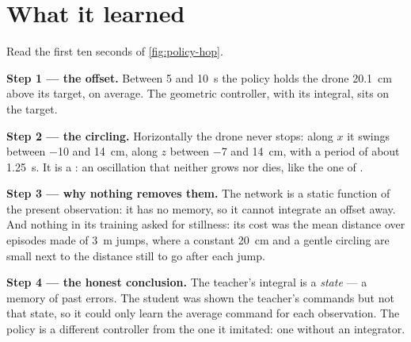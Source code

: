 \section{What it learned}


\begin{example}[Hover]
\label{ex:policy-hover}
Read the first ten seconds of \cref{fig:policy-hop}.

\textbf{Step 1 — the offset.} Between 5 and \SI{10}{s} the policy holds the drone \SI{20.1}{cm} above its target, on average. The geometric controller, with its integral, sits on the target.

\textbf{Step 2 — the circling.} Horizontally the drone never stops: along $x$ it swings between \SI{-10}{} and \SI{+14}{cm}, along $z$ between \SI{-7}{} and \SI{+14}{cm}, with a period of about \SI{1.25}{s}. It is a : an oscillation that neither grows nor dies, like the one of .

\textbf{Step 3 — why nothing removes them.} The network is a static function of the present observation: it has no memory, so it cannot integrate an offset away. And nothing in its training asked for stillness: its cost was the mean distance over episodes made of \SI{3}{m} jumps, where a constant \SI{20}{cm} and a gentle circling are small next to the distance still to go after each jump.

\textbf{Step 4 — the honest conclusion.} The teacher's integral is a \emph{state} — a memory of past errors. The student was shown the teacher's commands but not that state, so it could only learn the average command for each observation. The policy is a different controller from the one it imitated: one without an integrator.
\end{example}

